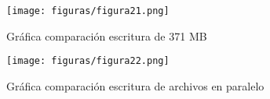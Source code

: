 \begin{figure}[H] %
	\centering
	\texttt{[image: figuras/figura21.png]}  %
	
	
	\caption{Gráfica comparación escritura de 371 MB}
	\label{figura21}
\end{figure}

\begin{figure}[H] %
	\centering
	\texttt{[image: figuras/figura22.png]}  %
	
	
	\caption{Gráfica comparación escritura de archivos en paralelo}
	\label{figura22}
\end{figure}
\newpage
